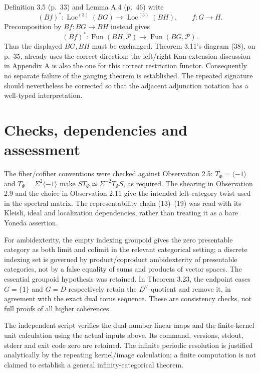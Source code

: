 \documentclass[10pt]{article}
\begin{document}
Definition 3.5 (p. 33) and Lemma A.4 (p. 46) write \[(Bf)^*:\operatorname{Loc}^{(3)}(BG)\longrightarrow\operatorname{Loc}^{(3)}(BH),
       \qquad f:G\longrightarrow H.\] Precomposition by \(Bf:BG\to BH\) instead gives \[(Bf)^*:\operatorname{Fun}(BH,\mathcal P)
            \longrightarrow\operatorname{Fun}(BG,\mathcal P).\] Thus the displayed \(BG,BH\) must be exchanged. Theorem 3.11’s diagram (38), on p. 35, already uses the correct direction; the left/right Kan-extension discussion in Appendix A is also the one for this correct restriction functor. Consequently no separate failure of the gauging theorem is established. The repeated signature should nevertheless be corrected so that the adjacent adjunction notation has a well-typed interpretation.\par
\section*{Checks, dependencies and assessment}
The fiber/cofiber conventions were checked against Observation 2.5: \(T_\Phi=\langle-1\rangle\) and \(T_\Psi=\Sigma^2\langle-1\rangle\) make \(S T_\Phi\simeq\Sigma^{-2}T_\Psi S\), as required. The shearing in Observation 2.9 and the choice in Observation 2.11 give the intended left-category twist used in the spectral matrix. The representability chain (13)–(19) was read with its Kleisli, ideal and localization dependencies, rather than treating it as a bare Yoneda assertion.\par
For ambidexterity, the empty indexing groupoid gives the zero presentable category as both limit and colimit in the relevant categorical setting; a discrete indexing set is governed by product/coproduct ambidexterity of presentable categories, not by a false equality of sums and products of vector spaces. The essential groupoid hypothesis was retained. In Theorem 3.23, the endpoint cases \(G=\{1\}\) and \(G=D\) respectively retain the \(D^\vee\)-quotient and remove it, in agreement with the exact dual torus sequence. These are consistency checks, not full proofs of all higher coherences.\par
The independent script verifies the dual-number linear maps and the finite-kernel unit calculation using the actual inputs above. Its command, versions, stdout, stderr and exit code zero are retained. The infinite periodic resolution is justified analytically by the repeating kernel/image calculation; a finite computation is not claimed to establish a general infinity-categorical theorem.\par
\end{document}
